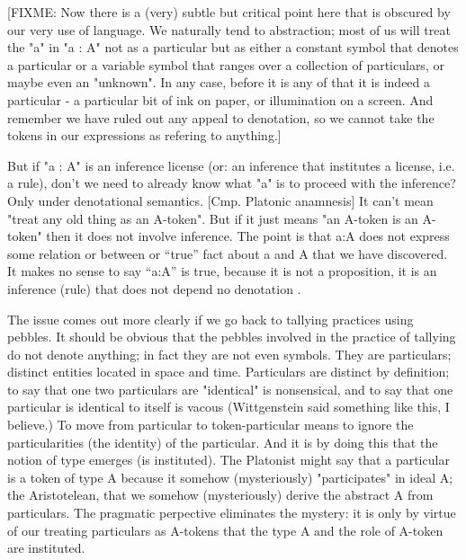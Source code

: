 \documentclass{article}
\begin{document}
[FIXME: Now there is a (very) subtle but critical point here that is
  obscured by our very use of language.  We naturally tend to
  abstraction; most of us will treat the "a" in "a : A" not as a
  particular but as either a constant symbol that denotes a particular
  or a variable symbol that ranges over a collection of particulars,
  or maybe even an "unknown".  In any case, before it is any of that
  it is indeed a particular - a particular bit of ink on paper, or
  illumination on a screen.  And remember we have ruled out any appeal
  to denotation, so we cannot take the tokens in our expressions as
  refering to anything.]

But if "a : A" is an inference license (or: an inference that
institutes a license, i.e. a rule), don't we need to already know what
"a" is to proceed with the inference?  Only under denotational
semantics.  [Cmp. Platonic anamnesis] It can't mean "treat any old
thing as an A-token".  But if it just means "an A-token is an A-token"
then it does not involve inference.  The point is that a:A does not
express some relation or between or ``true'' fact about a and A that
we have discovered.  It makes no sense to say ``a:A'' is true, because
it is not a proposition, it is an inference (rule) that does not
depend no denotation .

The issue comes out more clearly if we go back to tallying practices
using pebbles.  It should be obvious that the pebbles involved in the
practice of tallying do not denote anything; in fact they are not even
symbols.  They are particulars; distinct entities located in space and
time.  Particulars are distinct by definition; to say that one two
particulars are "identical" is nonsensical, and to say that one
particular is identical to itself is vacous (Wittgenstein said
something like this, I believe.)  To move from particular to
token-particular means to ignore the particularities (the identity) of
the particular.  And it is by doing this that the notion of type
emerges (is instituted).  The Platonist might say that a particular is
a token of type A because it somehow (mysteriously) "participates" in
ideal A; the Aristotelean, that we somehow (mysteriously) derive the
abstract A from particulars.  The pragmatic perpective eliminates the
mystery: it is only by virtue of our treating particulars as A-tokens
that the type A and the role of A-token are instituted.
\end{document}
